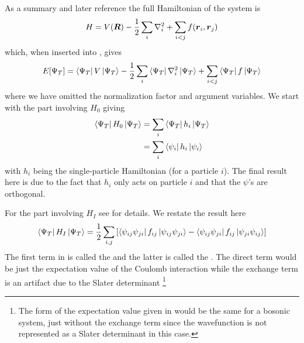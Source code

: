         As a summary and later reference the full Hamiltonian of the system is
            \begin{equation}
                H = V(\boldsymbol{{R}}) - \frac{1}{2}\sum_i\nabla^2_i + \sum\limits_{i<j} f(\boldsymbol{{r}}_i, \boldsymbol{{r}}_j)
            \end{equation}
        which, when inserted into , gives
            \begin{equation}
                E[\Psi_T] = \bra{\Psi_T}V\ket{\Psi_T} -
                \frac{1}{2}\sum_i\bra{\Psi_T}\nabla^2_i\ket{\Psi_T} +
                \sum\limits_{i<j}\bra{\Psi_T}f\ket{\Psi_T}
            \end{equation}
        where we have omitted the normalization factor and argument variables.
        We start with the part involving $H_0$ giving
            \begin{align}
                \bra{\Psi_T}H_0\ket{\Psi_T} &= \sum_{i}\bra{\Psi_T}h_i\ket{\Psi_T} \nonumber
                \\
                &= \sum_i\bra{\psi_i}h_i\ket{\psi_i} 
            \end{align}
        with $h_i$ being the single-particle Hamiltonian (for a particle $i$).
        The final result here is due to the fact that $h_i$ only acts on
        particle $i$ and that the $\psi$'s are orthogonal.

        For the part involving $H_I$ see  for details. We
        restate the result here
            \begin{equation}
                \bra{\Psi_T}H_I\ket{\Psi_T} = \frac{1}{2}
                \sum_{i,j}\left[\bra{\psi_{ij}\psi_{ji}}f_{ij}\ket{\psi_{ij}\psi_{ji}} -
                \bra{\psi_{ij}\psi_{ji}}f_{ij}\ket{\psi_{ji}\psi_{ij}}\right]
                \label{eq:dinner1}
            \end{equation}
        The first term in  is called the 
        and the latter is called the . The direct term
        would be just the expectation value of the Coulomb interaction while
        the exchange term is an artifact due to the Slater determinant
        \footnote{The form of the expectation value given in 
        would be the same for a bosonic system, just without the exchange term
        since the wavefunction is not represented as a Slater determinant in
        this case.}

